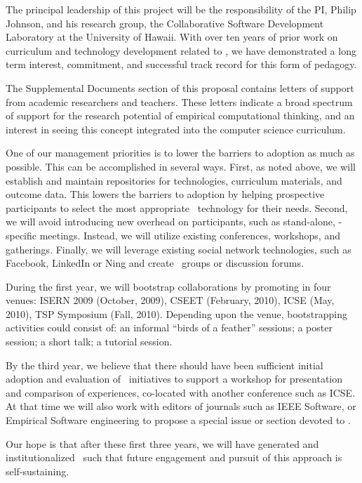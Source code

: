 The principal leadership of this project will be the responsibility of the
PI, Philip Johnson, and his research group, the Collaborative Software
Development Laboratory at the University of Hawaii.  With over ten years of
prior work on curriculum and technology development related to \eCT, we have
demonstrated a long term interest, commitment, and successful track record
for this form of pedagogy.

The Supplemental Documents section of this proposal contains letters of
support from academic researchers and teachers.  These letters indicate a
broad spectrum of support for the research potential of empirical
computational thinking, and an interest in seeing this concept integrated
into the computer science curriculum.

One of our management priorities is to lower the barriers to adoption as
much as possible.  This can be accomplished in several ways. First, as
noted above, we will establish and maintain repositories for technologies,
curriculum materials, and outcome data.  This lowers the barriers to
adoption by helping prospective participants to select the most appropriate
\eCT\ technology for their needs.  Second, we will avoid introducing new
overhead on participants, such as stand-alone, \eCT-specific
meetings. Instead, we will utilize existing conferences, workshops, and
gatherings.  Finally, we will leverage existing social network
technologies, such as Facebook, LinkedIn or Ning and create \eCT\ groups or
discussion forums.

During the first year, we will bootstrap collaborations by promoting \eCT
in four venues: ISERN 2009 (October, 2009), CSEET (February, 2010), ICSE
(May, 2010), TSP Symposium (Fall, 2010). Depending upon the venue,
bootstrapping activities could consist of: an informal ``birds of a
feather'' sessions; a poster session; a short talk; a tutorial session.  

By the third year, we believe that there should have been sufficient
initial adoption and evaluation of \eCT\ initiatives to support a workshop
for presentation and comparison of experiences, co-located with another
conference such as ICSE.  At that time we will also work with editors of
journals such as IEEE Software, or Empirical Software engineering to
propose a special issue or section devoted to \eCT.

Our hope is that after these first three years, we will have generated and 
institutionalized \eCT\ such that future engagement and pursuit of this 
approach is self-sustaining. 

